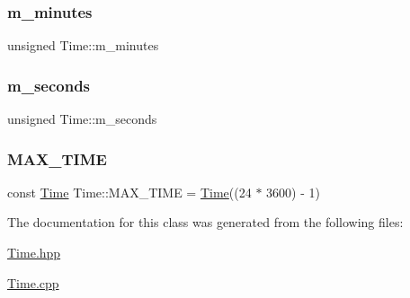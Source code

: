 \mbox{\label{classTime_abbae8355faea249a8777bf9b26f470fd}} 
\subsubsection{\texorpdfstring{m\+\_\+minutes}{m\_minutes}}
{\footnotesize\ttfamily unsigned Time\+::m\+\_\+minutes\hspace{0.3cm}{\ttfamily [private]}}

\mbox{\label{classTime_a068bd6e2a832b8eba85c5291b6321494}} 
\subsubsection{\texorpdfstring{m\+\_\+seconds}{m\_seconds}}
{\footnotesize\ttfamily unsigned Time\+::m\+\_\+seconds\hspace{0.3cm}{\ttfamily [private]}}

\mbox{\label{classTime_aeb625f84f2755479deac3ca3fd1d1cb4}} 
\subsubsection{\texorpdfstring{M\+A\+X\+\_\+\+T\+I\+ME}{MAX\_TIME}}
{\footnotesize\ttfamily const \hyperlink{classTime}{Time} Time\+::\+M\+A\+X\+\_\+\+T\+I\+ME = \hyperlink{classTime}{Time}((24 $\ast$ 3600) -\/ 1)\hspace{0.3cm}{\ttfamily [static]}}



The documentation for this class was generated from the following files\+:\begin{DoxyCompactItemize}
\item 
\hyperlink{Time_8hpp}{Time.\+hpp}\item 
\hyperlink{Time_8cpp}{Time.\+cpp}\end{DoxyCompactItemize}
